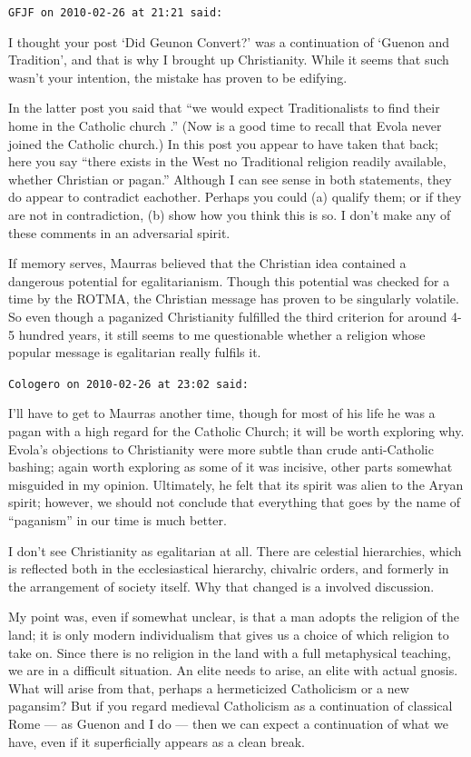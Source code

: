 \begin{footnotesize}
\begin{sffamily}
\texttt{GFJF on 2010-02-26 at 21:21 said:}

I thought your post `Did Geunon Convert?' was a continuation of `Guenon and Tradition', and that is why I brought up Christianity. While it seems that such wasn't your intention, the mistake has proven to be edifying.

In the latter post you said that ``we would expect Traditionalists to find their home in the Catholic church .'' (Now is a good time to recall that Evola never joined the Catholic church.) In this post you appear to have taken that back; here you say ``there exists in the West no Traditional religion readily available, whether Christian or pagan.'' Although I can see sense in both statements, they do appear to contradict eachother. Perhaps you could (a) qualify them; or if they are not in contradiction, (b) show how you think this is so. I don't make any of these comments in an adversarial spirit.

If memory serves, Maurras believed that the Christian idea contained a dangerous potential for egalitarianism. Though this potential was checked for a time by the ROTMA, the Christian message has proven to be singularly volatile. So even though a paganized Christianity fulfilled the third criterion for around 4-5 hundred years, it still seems to me questionable whether a religion whose popular message is egalitarian really fulfils it.

\hfill

\texttt{Cologero on 2010-02-26 at 23:02 said:}

I'll have to get to Maurras another time, though for most of his life he was a pagan with a high regard for the Catholic Church; it will be worth exploring why. Evola's objections to Christianity were more subtle than crude anti-Catholic bashing; again worth exploring as some of it was incisive, other parts somewhat misguided in my opinion. Ultimately, he felt that its spirit was alien to the Aryan spirit; however, we should not conclude that everything that goes by the name of ``paganism'' in our time is much better.

I don't see Christianity as egalitarian at all. There are celestial hierarchies, which is reflected both in the ecclesiastical hierarchy, chivalric orders, and formerly in the arrangement of society itself. Why that changed is a involved discussion.

My point was, even if somewhat unclear, is that a man adopts the religion of the land; it is only modern individualism that gives us a choice of which religion to take on. Since there is no religion in the land with a full metaphysical teaching, we are in a difficult situation. An elite needs to arise, an elite with actual gnosis. What will arise from that, perhaps a hermeticized Catholicism or a new pagansim? But if you regard medieval Catholicism as a continuation of classical Rome --- as Guenon and I do --- then we can expect a continuation of what we have, even if it superficially appears as a clean break.


\end{sffamily}
\end{footnotesize}
